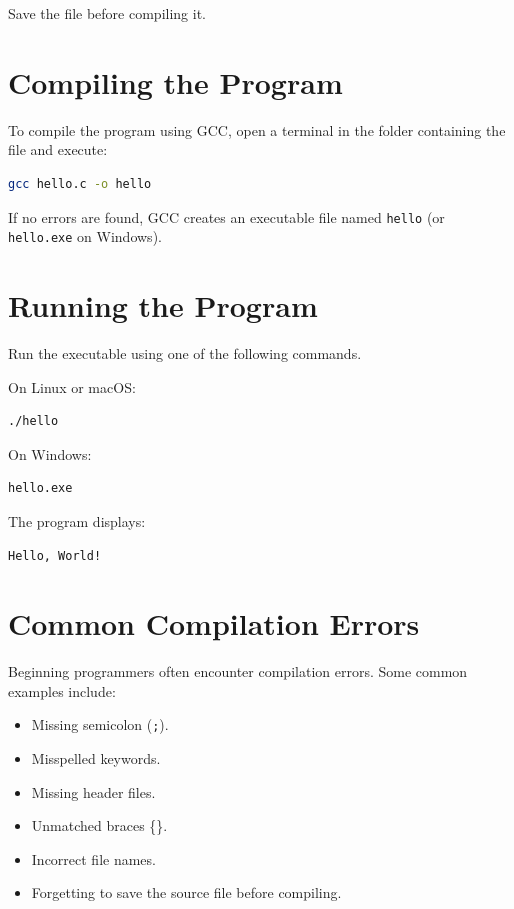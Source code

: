 \documentclass[12pt,openany]{book}
\begin{document}
Save the file before compiling it.

\section{Compiling the Program}

To compile the program using GCC, open a terminal in the folder containing the file and execute:

\begin{lstlisting}[language=bash]
gcc hello.c -o hello
\end{lstlisting}

If no errors are found, GCC creates an executable file named \texttt{hello} (or \texttt{hello.exe} on Windows).

\section{Running the Program}

Run the executable using one of the following commands.

On Linux or macOS:

\begin{lstlisting}[language=bash]
./hello
\end{lstlisting}

On Windows:

\begin{lstlisting}[language=bash]
hello.exe
\end{lstlisting}

The program displays:

\begin{lstlisting}
Hello, World!
\end{lstlisting}

\section{Common Compilation Errors}

Beginning programmers often encounter compilation errors. Some common examples include:

\begin{itemize}
    \item Missing semicolon (\texttt{;}).
    \item Misspelled keywords.
    \item Missing header files.
    \item Unmatched braces \{\}.
    \item Incorrect file names.
    \item Forgetting to save the source file before compiling.
\end{itemize}
\end{document}
